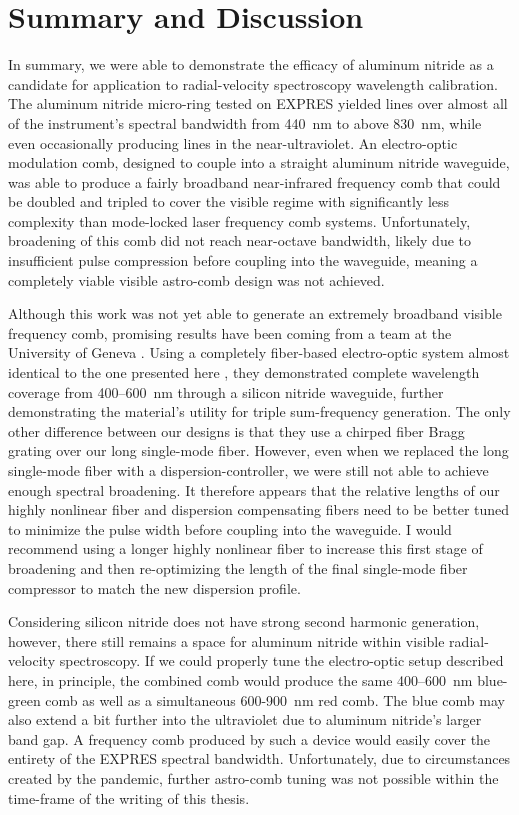 \section{Summary and Discussion}

In summary, we were able to demonstrate the efficacy of aluminum nitride as a candidate for application to radial-velocity spectroscopy wavelength calibration. The aluminum nitride micro-ring tested on EXPRES yielded lines over almost all of the instrument's spectral bandwidth from 440~\si{\nano\meter} to above 830~\si{\nano\meter}, while even occasionally producing lines in the near-ultraviolet. An electro-optic modulation comb, designed to couple into a straight aluminum nitride waveguide, was able to produce a fairly broadband near-infrared frequency comb that could be doubled and tripled to cover the visible regime with significantly less complexity than mode-locked laser frequency comb systems. Unfortunately, broadening of this comb did not reach near-octave bandwidth, likely due to insufficient pulse compression before coupling into the waveguide, meaning a completely viable visible astro-comb design was not achieved.

Although this work was not yet able to generate an extremely broadband visible frequency comb, promising results have been coming from a team at the University of Geneva \citep{obrzud_visible_2019}. Using a completely fiber-based electro-optic system almost identical to the one presented here \citep{obrzud_microphotonic_2019}, they demonstrated complete wavelength coverage from 400--600~\si{\nano\meter} through a silicon nitride waveguide, further demonstrating the material's utility for triple sum-frequency generation. The only other difference between our designs is that they use a chirped fiber Bragg grating over our long single-mode fiber. However, even when we replaced the long single-mode fiber with a dispersion-controller, we were still not able to achieve enough spectral broadening. It therefore appears that the relative lengths of our highly nonlinear fiber and dispersion compensating fibers need to be better tuned to minimize the pulse width before coupling into the waveguide. I would recommend using a longer highly nonlinear fiber to increase this first stage of broadening and then re-optimizing the length of the final single-mode fiber compressor to match the new dispersion profile.

Considering silicon nitride does not have strong second harmonic generation, however, there still remains a space for aluminum nitride within visible radial-velocity spectroscopy. If we could properly tune the electro-optic setup described here, in principle, the combined comb would produce the same 400--600~\si{\nano\meter} blue-green comb as well as a simultaneous 600-900~\si{\nano\meter} red comb. The blue comb may also extend a bit further into the ultraviolet due to aluminum nitride's larger band gap. A frequency comb produced by such a device would easily cover the entirety of the EXPRES spectral bandwidth. Unfortunately, due to circumstances created by the pandemic, further astro-comb tuning was not possible within the time-frame of the writing of this thesis.

